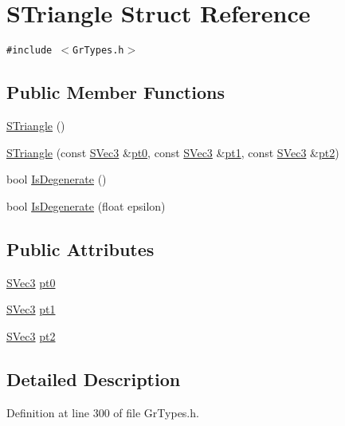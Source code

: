 \hypertarget{struct_s_triangle}{
\section{STriangle Struct Reference}
\label{struct_s_triangle}
}
{\tt \#include $<$GrTypes.h$>$}

\subsection*{Public Member Functions}
\begin{CompactItemize}
\item 
\hyperlink{struct_s_triangle_4a1f67c28ab4247e1cb17f0d9366c372}{STriangle} ()
\item 
\hyperlink{struct_s_triangle_70c618fb4935e6cd2c96f4db3e7ca972}{STriangle} (const \hyperlink{struct_s_vec3}{SVec3} \&\hyperlink{struct_s_triangle_5838f7a1465e40e3a74c08e7a0b9f03a}{pt0}, const \hyperlink{struct_s_vec3}{SVec3} \&\hyperlink{struct_s_triangle_42265ebbf2f6ad015e0fae5396e65ef7}{pt1}, const \hyperlink{struct_s_vec3}{SVec3} \&\hyperlink{struct_s_triangle_e168760ee842e2d1fce900ca6540169f}{pt2})
\item 
bool \hyperlink{struct_s_triangle_a6f228032366e82f1646488926ccc75e}{IsDegenerate} ()
\item 
bool \hyperlink{struct_s_triangle_f1dfbe6d791c5ff702a586a14ec43764}{IsDegenerate} (float epsilon)
\end{CompactItemize}
\subsection*{Public Attributes}
\begin{CompactItemize}
\item 
\hyperlink{struct_s_vec3}{SVec3} \hyperlink{struct_s_triangle_5838f7a1465e40e3a74c08e7a0b9f03a}{pt0}
\item 
\hyperlink{struct_s_vec3}{SVec3} \hyperlink{struct_s_triangle_42265ebbf2f6ad015e0fae5396e65ef7}{pt1}
\item 
\hyperlink{struct_s_vec3}{SVec3} \hyperlink{struct_s_triangle_e168760ee842e2d1fce900ca6540169f}{pt2}
\end{CompactItemize}


\subsection{Detailed Description}


Definition at line 300 of file GrTypes.h.

